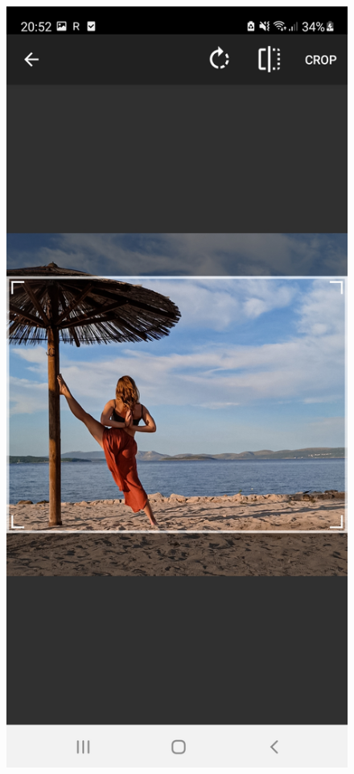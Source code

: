\documentclass[a4paper, 12pt]{book}
\begin{document}
\begin{figure}[!ht]
\begin{minipage}[b]{0.32\textwidth}
    \label{menu}
  \end{minipage}
  \begin{minipage}[b]{0.32\textwidth}
    \includegraphics[width=\textwidth]{photocrop.jpg}\centering

\end{minipage}
\end{figure}
\end{document}
